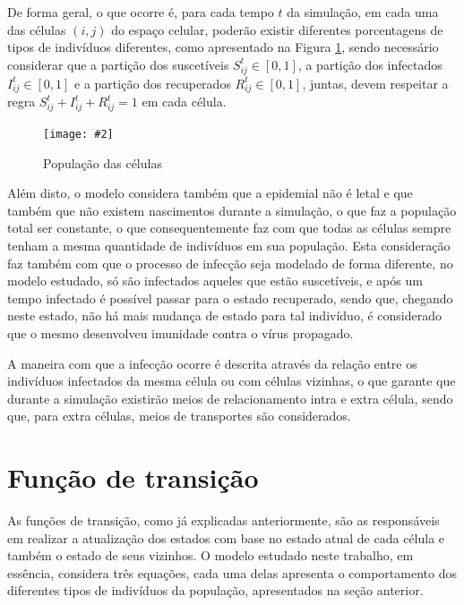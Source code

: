 \documentclass[
	11pt,				%
	openright,			%
	oneside,			%
	a4paper,			%
	english,			%
	french,				%
	spanish,			%
	brazil,				%
	]{abntex2}
\newcommand{\image}[5]{
    \begin{figure}[H]%
        \begin{center}
        \caption{#3}
        \texttt{[image: \#2]}
        \label{#4}
        \fonte{#5}
        \end{center}
    \end{figure}
}
\begin{document}
\par De forma geral, o que ocorre é, para cada tempo $t$ da simulação, em cada uma das células $(i, j)$ do espaço celular, poderão existir diferentes porcentagens de tipos de indivíduos diferentes, como apresentado na Figura \ref{figure:cellArticle}, sendo necessário considerar que a partição dos suscetíveis $S_{ij}^t \in [0, 1]$, a partição dos infectados $I_{ij}^t \in [0, 1]$ e a partição dos recuperados $R_{ij}^t \in [0, 1]$, juntas, devem respeitar a regra $S_{ij}^t + I_{ij}^t + R_{ij}^t = 1$ em cada célula.


\image{0.35}{images/modelo_ca_artigo_v2.png}{População das células}{figure:cellArticle}{Produção dos autores}

\par Além disto, o modelo considera também que a epidemial não é letal e que também que não existem nascimentos durante a simulação, o que faz a população total ser constante, o que consequentemente faz com que todas as células sempre tenham a mesma quantidade de indivíduos em sua população. Esta consideração faz também com que o processo de infecção seja modelado de forma diferente, no modelo estudado, só são infectados aqueles que estão suscetíveis, e após um tempo infectado é possível passar para o estado recuperado, sendo que, chegando neste estado, não há mais mudança de estado para tal indivíduo, é considerado que o mesmo desenvolveu imunidade contra o vírus propagado.

\par A maneira com que a infecção ocorre é descrita através da relação entre os indivíduos infectados da mesma célula ou com células vizinhas, o que garante que durante a simulação existirão meios de relacionamento intra e extra célula, sendo que, para extra células, meios de transportes são considerados.

\section{Função de transição}

\par As funções de transição, como já explicadas anteriormente, são as responsáveis em realizar a atualização dos estados com base no estado atual de cada célula e também o estado de seus vizinhos. O modelo estudado neste trabalho, em essência, considera três equações, cada uma delas apresenta o comportamento dos diferentes tipos de indivíduos da população, apresentados na seção anterior.
\end{document}
